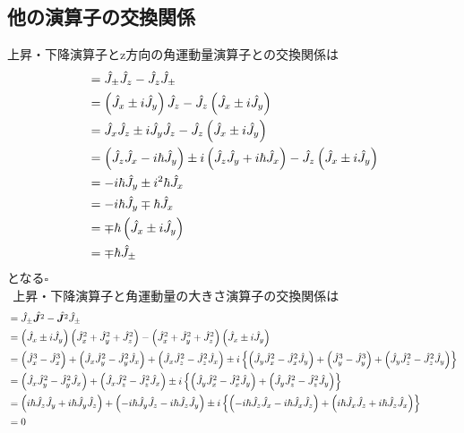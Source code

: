 \documentclass{jsarticle}  %
\numberwithin{equation}{section} %
\numberwithin{figure}{section}
\begin{document}
\subsection{他の演算子の交換関係}
    上昇・下降演算子とz方向の角運動量演算子との交換関係は
    \begin{align}
        [\hat{J}_{\pm},\hat{J}_z] &= \hat{J}_{\pm} \hat{J}_z - \hat{J}_z \hat{J}_{\pm} \notag \\ 
        &= \left( \hat{J}_x \pm i\hat{J}_y \right) \hat{J}_z - \hat{J}_z \left( \hat{J}_x \pm i\hat{J}_y \right) \notag \\
        &= \hat{J}_x \hat{J}_z \pm i \hat{J}_y \hat{J}_z - \hat{J}_z \left( \hat{J}_x \pm i\hat{J}_y \right) \notag \\
        &= \left( \hat{J}_z \hat{J}_x - i\hbar \hat{J}_y\right) \pm i \left( \hat{J}_z \hat{J}_y + i\hbar \hat{J}_x \right) - \hat{J}_z \left( \hat{J}_x \pm i\hat{J}_y \right) \notag \\
        &= - i\hbar \hat{J}_y \pm i^2\hbar \hat{J}_x \notag \\
        &= - i\hbar \hat{J}_y \mp \hbar \hat{J}_x \notag \\
        &=\mp \hbar \left( \hat{J}_x \pm i\hat{J}_y \right) \notag \\
        &= \mp \hbar \hat{J}_{\pm}
    \end{align}
    となる$\square$\\
    $\ \ $上昇・下降演算子と角運動量の大きさ演算子の交換関係は
    \begin{align}
        [\hat{J}_{\pm},\hat{\bm{J}^2}] &= \hat{J}_{\pm} \hat{\bm{J}^2} - \hat{\bm{J}^2}\hat{J}_{\pm} \notag \\
        &= \left( \hat{J}_x \pm i\hat{J}_y \right) \left( \hat{J}_x^2 + \hat{J}_y^2 + \hat{J}_z^2 \right) - \left( \hat{J}_x^2 + \hat{J}_y^2 + \hat{J}_z^2 \right) \left( \hat{J}_x \pm i\hat{J}_y \right) \notag \\
        &= \left( \hat{J}_x^3 -\hat{J}_x^3\right) + \left( \hat{J}_x \hat{J}_y^2 - \hat{J}_y^2 \hat{J}_x\right) + \left( \hat{J}_x \hat{J}_z^2 -\hat{J}_z^2\hat{J}_x \right) \pm i\left\{ \left( \hat{J}_y \hat{J}_x^2 - \hat{J}_x^2 \hat{J}_y \right) + \left( \hat{J}_y^3 - \hat{J}_y^3 \right) + \left( \hat{J}_y \hat{J}_z^2 - \hat{J}_z^2 \hat{J}_y \right) \right\} \notag \\
        &= \left( \hat{J}_x \hat{J}_y^2 - \hat{J}_y^2 \hat{J}_x\right) + \left( \hat{J}_x \hat{J}_z^2 -\hat{J}_z^2\hat{J}_x \right) \pm i\left\{ \left( \hat{J}_y \hat{J}_x^2 - \hat{J}_x^2 \hat{J}_y \right) + \left( \hat{J}_y \hat{J}_z^2 - \hat{J}_z^2 \hat{J}_y \right) \right\} \notag \\
        &= \left( i\hbar\hat{J}_z\hat{J}_y  + i\hbar \hat{J}_y \hat{J}_z\right) + \left( -i\hbar \hat{J}_y \hat{J}_z -i\hbar \hat{J}_z\hat{J}_y \right) \pm i\left\{ \left( -i\hbar \hat{J}_z \hat{J}_x - i\hbar \hat{J}_x \hat{J}_z \right) + \left( i\hbar \hat{J}_x \hat{J}_z + i\hbar \hat{J}_z \hat{J}_x \right) \right\} \notag \\
        &= 0
    \end{align}
\end{document}
